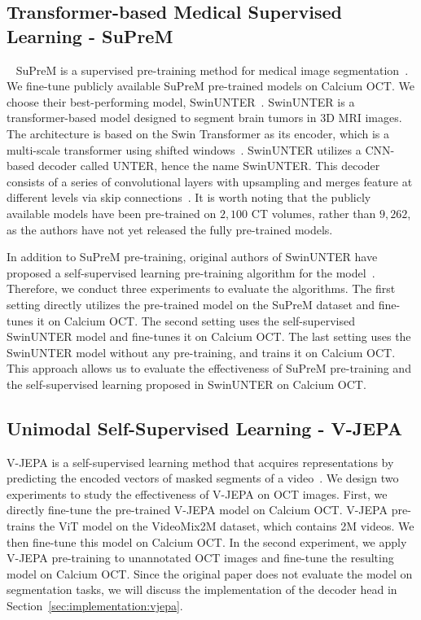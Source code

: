 \documentclass[a4paper,11pt,oneside]{report}
\begin{document}
\subsection{Transformer-based Medical Supervised Learning - SuPreM}~\label{sec:design:suprem}
SuPreM is a supervised pre-training method for medical image segmentation~\cite{Li2024}. We fine-tune publicly available SuPreM pre-trained models on Calcium OCT. We choose their best-performing model, SwinUNTER~\cite{Tang2022}. SwinUNTER is a transformer-based model designed to segment brain tumors in 3D MRI images. The architecture is based on the Swin Transformer as its encoder, which is a multi-scale transformer using shifted windows~\cite{Liu2021Swin}. SwinUNTER utilizes a CNN-based decoder called UNTER, hence the name SwinUNTER. This decoder consists of a series of convolutional layers with upsampling and merges feature at different levels via skip connections~\cite{Hatamizadeh2022}. It is worth noting that the publicly available models have been pre-trained on $2,100$ CT volumes, rather than $9,262$, as the authors have not yet released the fully pre-trained models.

In addition to SuPreM pre-training, original authors of SwinUNTER have proposed a self-supervised learning pre-training algorithm for the model~\cite{Tang2022}. Therefore, we conduct three experiments to evaluate the algorithms. The first setting directly utilizes the pre-trained model on the SuPreM dataset and fine-tunes it on Calcium OCT. The second setting uses the self-supervised SwinUNTER model and fine-tunes it on Calcium OCT. The last setting uses the SwinUNTER model without any pre-training, and trains it on Calcium OCT. This approach allows us to evaluate the effectiveness of SuPreM pre-training and the self-supervised learning proposed in SwinUNTER on Calcium OCT.

\subsection{Unimodal Self-Supervised Learning - V-JEPA}
V-JEPA is a self-supervised learning method that acquires representations by predicting the encoded vectors of masked segments of a video~\cite{Bardes2024Vjepa}. We design two experiments to study the effectiveness of V-JEPA on OCT images. First, we directly fine-tune the pre-trained V-JEPA model on Calcium OCT. V-JEPA pre-trains the ViT model on the VideoMix2M dataset, which contains 2M videos. We then fine-tune this model on Calcium OCT. In the second experiment, we apply V-JEPA pre-training to unannotated OCT images and fine-tune the resulting model on Calcium OCT. Since the original paper does not evaluate the model on segmentation tasks, we will discuss the implementation of the decoder head in Section~\ref{sec:implementation:vjepa}.
\end{document}
